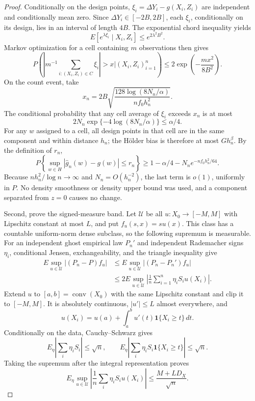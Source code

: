 \documentclass{article}
\begin{document}
\begin{proof}
Conditionally on the design points, \(\xi_i=\Delta Y_i-g(X_i,Z_i)\) are independent and conditionally mean zero.  Since \(\Delta Y_i\in[-2B,2B]\), each \(\xi_i\), conditionally on its design, lies in an interval of length \(4B\).  The exponential chord inequality yields
\[
 E[e^{\lambda\xi_i}\mid X_i,Z_i]\leq e^{2\lambda^2B^2}.
\]
Markov optimization for a cell containing \(m\) observations then gives
\[
 P\!\left(\left|m^{-1}\sum_{i:(X_i,Z_i)\in C}\xi_i\right|>x
 \mathrel{\Big|}(X_i,Z_i)_{i=1}^n\right)
 \leq2\exp\!\left(-\frac{mx^2}{8B^2}\right).
\]
On the count event, take
\[
 x_n=2B\sqrt{\frac{128\log(8N_n/\alpha)}{nf_0h_n^2}}.
\]
The conditional probability that any cell average of \(\xi_i\) exceeds \(x_n\) is at most
\[
 2N_n\exp\{-4\log(8N_n/\alpha)\}\leq\alpha/4.
\]
For any \(w\) assigned to a cell, all design points in that cell are in the same component and within distance \(h_n\); the H\"older bias is therefore at most \(Gh_n^\beta\).  By the definition of \(r_n\),
\[
 P\!\left\{\sup_{w\in H}|\widehat g_n(w)-g(w)|\leq r_n\right\}
 \geq1-\alpha/4-N_ne^{-nf_0h_n^2/64}.
\]
Because \(nh_n^2/\log n\to\infty\) and \(N_n=O(h_n^{-2})\), the last term is \(o(1)\), uniformly in \(P\).  No density smoothness or density upper bound was used, and a component separated from \(z=0\) causes no change.

Second, prove the signed-measure band.  Let \(\mathcal U\) be all \(u:X_0\to[-M,M]\) with Lipschitz constant at most \(L\), and put \(f_u(s,x)=su(x)\).  This class has a countable uniform-norm dense subclass, so the following supremum is measurable.  For an independent ghost empirical law \(P_n'\) and independent Rademacher signs \(\eta_i\), conditional Jensen, exchangeability, and the triangle inequality give
\[
 \begin{aligned}
 E\sup_{u\in\mathcal U}|(P_n-P)f_u|
 &\leq E\sup_{u\in\mathcal U}|(P_n-P_n')f_u|\\
 &\leq2E\sup_{u\in\mathcal U}
 \left|\frac1n\sum_{i=1}^n\eta_iS_iu(X_i)\right|.
 \end{aligned}
\]
Extend \(u\) to \([a,b]=\operatorname{conv}(X_0)\) with the same Lipschitz constant and clip it to \([-M,M]\).  It is absolutely continuous, \(|u'|\leq L\) almost everywhere, and
\[
 u(X_i)=u(a)+\int_a^b u'(t)\mathbf1\{X_i\geq t\}\,dt.
\]
Conditionally on the data, Cauchy--Schwarz gives
\[
 E_\eta\left|\sum_i\eta_iS_i\right|\leq\sqrt n,
 \qquad
 E_\eta\left|\sum_i\eta_iS_i\mathbf1\{X_i\geq t\}\right|\leq\sqrt n.
\]
Taking the supremum after the integral representation proves
\[
 E_\eta\sup_{u\in\mathcal U}
 \left|\frac1n\sum_i\eta_iS_iu(X_i)\right|
 \leq\frac{M+LD_X}{\sqrt n}.
\]


\end{proof}
\end{document}
